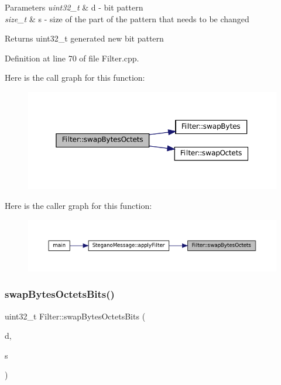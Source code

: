 \begin{DoxyParams}{Parameters}
{\em uint32\+\_\+t} & d -\/ bit pattern \\
\hline
{\em size\+\_\+t} & s -\/ size of the part of the pattern that needs to be changed \\
\hline
\end{DoxyParams}
\begin{DoxyReturn}{Returns}
uint32\+\_\+t generated new bit pattern 
\end{DoxyReturn}


Definition at line 70 of file Filter.\+cpp.

Here is the call graph for this function\+:\nopagebreak
\begin{figure}[H]
\begin{center}
\leavevmode
\includegraphics[width=350pt]{classFilter_a55c046859fbbb468536cae5c1f95c702_cgraph}
\end{center}
\end{figure}
Here is the caller graph for this function\+:\nopagebreak
\begin{figure}[H]
\begin{center}
\leavevmode
\includegraphics[width=350pt]{classFilter_a55c046859fbbb468536cae5c1f95c702_icgraph}
\end{center}
\end{figure}
\mbox{\label{classFilter_a9c8e2eb790e7e9dff6493a12a1fefc4f}} 
\subsubsection{\texorpdfstring{swapBytesOctetsBits()}{swapBytesOctetsBits()}}
{\footnotesize\ttfamily uint32\+\_\+t Filter\+::swap\+Bytes\+Octets\+Bits (\begin{DoxyParamCaption}\item[{uint32\+\_\+t}]{d,  }\item[{size\+\_\+t}]{s }\end{DoxyParamCaption})\hspace{0.3cm}{\ttfamily [static]}}



